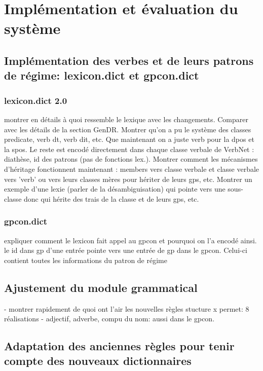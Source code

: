 \chapter{Implémentation et évaluation du système}\label{eval}

\section{Implémentation des verbes et de leurs patrons de régime: lexicon.dict et gpcon.dict}

\subsection{lexicon.dict 2.0}
montrer en détails à quoi ressemble le lexique avec les changements. Comparer avec les détails de la section GenDR. Montrer qu'on a pu le système des classes predicate, verb dt, verb dit, etc. Que maintenant on a juste verb pour la dpos et la spos. Le reste est encodé directement dans chaque classe verbale de VerbNet : diathèse, id des patrons (pas de fonctions lex.). Montrer comment les mécanismes d'héritage fonctionnent maintenant : members vers classe verbale et classe verbale vers 'verb' ou vers leurs classes mères pour hériter de leurs gps, etc. Montrer un exemple d'une lexie (parler de la désambiguisation) qui pointe vers une sous-classe donc qui hérite des trais de la classe et de leurs gps, etc.

\subsection{gpcon.dict}
expliquer comment le lexicon fait appel au gpcon et pourquoi on l'a encodé ainsi. le id dans gp d'une entrée pointe vers une entrée de gp dans le gpcon. Celui-ci contient toutes les informations du patron de régime

\section{Ajustement du module grammatical}
- montrer rapidement de quoi ont l'air les nouvelles règles
stucture x permet: 8 réalisations
- adjectif, adverbe, compu du nom: aussi dans le gpcon.


\section{Adaptation des anciennes règles pour tenir compte des nouveaux dictionnaires}


